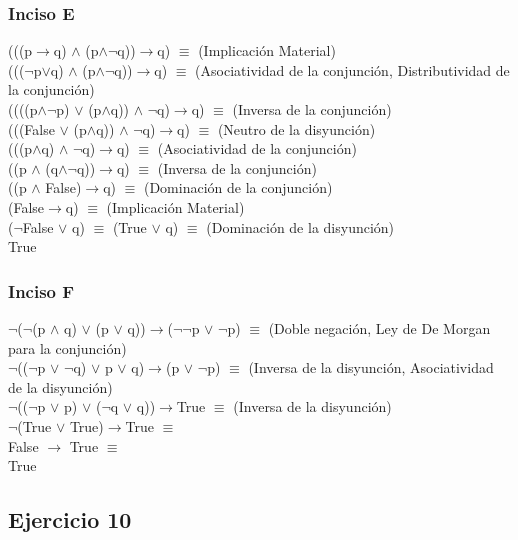 		\subsubsection{Inciso E}
		(((p$\rightarrow$q) $\wedge$ (p$\wedge$$\neg$q))$\rightarrow$q) $\equiv$ (Implicación Material)\\
		((($\neg$p$\vee$q) $\wedge$ (p$\wedge$$\neg$q))$\rightarrow$q) $\equiv$ (Asociatividad de la conjunción, Distributividad de la conjunción)\\
		((((p$\wedge$$\neg$p) $\vee$ (p$\wedge$q)) $\wedge$ $\neg$q)$\rightarrow$q) $\equiv$ (Inversa de la conjunción)\\
		(((False $\vee$ (p$\wedge$q)) $\wedge$ $\neg$q)$\rightarrow$q) $\equiv$ (Neutro de la disyunción)\\
		(((p$\wedge$q) $\wedge$ $\neg$q)$\rightarrow$q) $\equiv$ (Asociatividad de la conjunción)\\
		((p $\wedge$ (q$\wedge$$\neg$q))$\rightarrow$q) $\equiv$ (Inversa de la conjunción)\\
		((p $\wedge$ False)$\rightarrow$q) $\equiv$ (Dominación de la conjunción)\\
		(False$\rightarrow$q) $\equiv$ (Implicación Material)\\
		($\neg$False $\vee$ q) $\equiv$ (True $\vee$ q) $\equiv$ (Dominación de la disyunción)\\
		True
		
		\subsubsection{Inciso F}
		$\neg$($\neg$(p $\wedge$ q) $\vee$ (p $\vee$ q))$\rightarrow$($\neg$$\neg$p $\vee$ $\neg$p) $\equiv$ (Doble negación, Ley de De Morgan para la conjunción)\\
		$\neg$(($\neg$p $\vee$ $\neg$q) $\vee$ p $\vee$ q)$\rightarrow$(p $\vee$ $\neg$p) $\equiv$ (Inversa de la disyunción, Asociatividad de la disyunción)\\
		$\neg$(($\neg$p $\vee$ p) $\vee$ ($\neg$q $\vee$ q))$\rightarrow$True $\equiv$ (Inversa de la disyunción)\\
		$\neg$(True $\vee$ True)$\rightarrow$True $\equiv$\\
		False $\rightarrow$ True $\equiv$\\
		True
	\subsection{Ejercicio 10}
	

